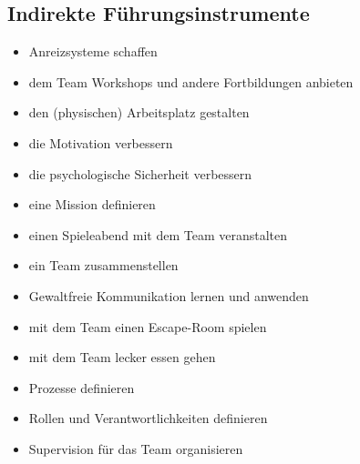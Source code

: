\subsection{Indirekte Führungsinstrumente}

\begin{itemize}
  \item Anreizsysteme schaffen
  \item dem Team Workshops und andere Fortbildungen anbieten
  \item den (physischen) Arbeitsplatz gestalten
  \item die Motivation verbessern
  \item die psychologische Sicherheit verbessern
  \item eine Mission definieren
  \item einen Spieleabend mit dem Team veranstalten
  \item ein Team zusammenstellen
  \item Gewaltfreie Kommunikation lernen und anwenden
  \item mit dem Team einen Escape-Room spielen
  \item mit dem Team lecker essen gehen
  \item Prozesse definieren
  \item Rollen und Verantwortlichkeiten definieren
  \item Supervision für das Team organisieren
\end{itemize}
